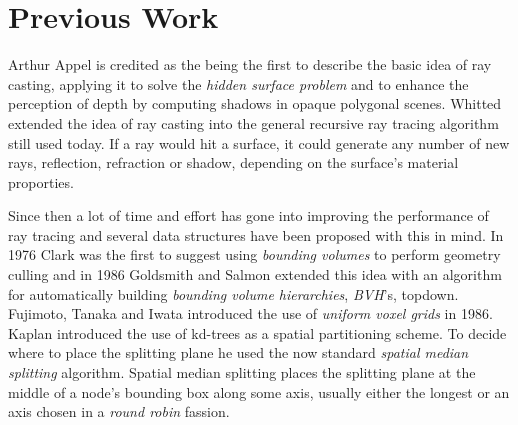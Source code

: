 




\clearpage

\section{Previous Work}



Arthur Appel is credited as the being the first to describe
the basic idea of ray casting, applying it to solve the \textit{hidden surface
problem} and to enhance the perception of depth by computing shadows in opaque
polygonal scenes. Whitted extended the idea of ray
casting into the general recursive ray tracing algorithm still used today. If a
ray would hit a surface, it could generate any number of new rays, reflection,
refraction or shadow, depending on the surface's material proporties.


Since then a lot of time and effort has gone into improving the performance of
ray tracing and several data structures have been proposed with this in mind. In
1976 Clark was the first to suggest using
\textit{bounding volumes} to perform geometry culling and in 1986 Goldsmith and
Salmon extended this idea with an algorithm for
automatically building \textit{bounding volume hierarchies}, \textit{BVH}'s,
topdown. Fujimoto, Tanaka and Iwata introduced the use
of \textit{uniform voxel grids} in 1986. Kaplan introduced
the use of kd-trees as a spatial partitioning scheme. To decide where to place
the splitting plane he used the now standard \textit{spatial median splitting}
algorithm. Spatial median splitting places the splitting plane at the middle of
a node's bounding box along some axis, usually either the longest or an axis
chosen in a \textit{round robin} fassion.


